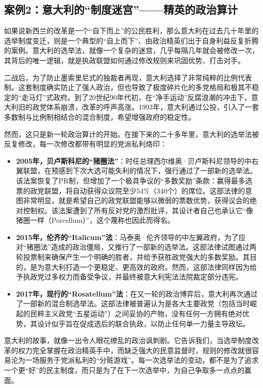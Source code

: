 \subsection{案例2：意大利的“制度迷宫”——精英的政治算计}

如果说新西兰的改革是一个“自下而上”的公民胜利，那么意大利在过去几十年里的选举制度变迁，则是一个典型的“自上而下”、由政治精英们出于自身利益反复折腾的案例。意大利的选举法，就像一个复杂的迷宫，几乎每隔几年就会被修改一次，其背后的唯一逻辑，就是执政联盟如何通过修改规则来巩固优势、打击对手。

二战后，为了防止墨索里尼式的独裁者再现，意大利选择了非常纯粹的比例代表制。这套制度确实防止了强人政治，但也导致了极度碎片化的多党格局和极其不稳定的“走马灯”式政府。到了20世纪90年代初，在“净手运动”反腐浪潮的冲击下，意大利旧的政党体系崩溃，改革的呼声高涨。1993年，意大利通过公投，引入了一套多数制与比例制相结合的混合制度，希望增强政府的稳定性。

然而，这只是新一轮政治算计的开始。在接下来的二十多年里，意大利的选举法被反复修改，每一次修改都带有明显的党派私利烙印：

\begin{itemize}
    \item \textbf{2005年，贝卢斯科尼的“猪圈法”}：时任总理西尔维奥·贝卢斯科尼领导的中右翼联盟，在预感到下次大选可能失利的情况下，强行通过了一部新的选举法。该法案恢复了PR制，但增加了一个极具争议的“多数奖励”条款：赢得最多选票的政党联盟，将自动获得众议院至少54\%（340个）的席位。这部法律的意图非常明显，就是希望自己的政党联盟能够以微弱的票数优势，获得议会的绝对控制权。该法案遭到了所有反对党的激烈批评，其设计者自己也承认它“像猪圈一样（Porcellum）”，这个蔑称也因此而得名。
    \item \textbf{2015年，伦齐的“Italicum”法}：马泰奥·伦齐领导的中左翼政府，为了应对“猪圈法”造成的政治僵局，又推行了一部新的选举法。这部法律试图通过两轮投票制来确保产生一个明确的胜者，并给予获胜政党强大的多数奖励。其目的，是为意大利打造一个更稳定、更高效的政府。然而，这部法律同样因为给予执政党过多权力而备受争议，并最终被意大利宪法法院裁定部分违宪。
    \item \textbf{2017年，现行的“Rosatellum”法}：在又一轮的政治博弈后，意大利再次通过了一部新的混合制选举法。这部法律被普遍认为是各大主要政党（包括当时崛起的民粹主义政党“五星运动”）之间妥协的产物，没有任何一方拥有绝对优势，其设计似乎旨在促成选后的联合执政，以防止任何单一力量主导政坛。
\end{itemize}

意大利的故事，就像一出令人眼花缭乱的政治讽刺剧。它告诉我们，当选举制度改革的权力完全掌握在政治精英手中，而缺乏强大的民意监督时，规则的修改就很容易沦为一场服务于党派私利的“分赃游戏”。每一次选举法的变动，都不是为了追求一个更“好”的民主制度，而只是为了在下一次选举中，为自己争取多一点点的赢面。

